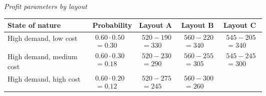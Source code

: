 \begin{ExamProblems}
		\begin{center}
			\textit{Profit parameters by layout}
			\begin{tabular}{l p{0.12\linewidth} p{0.16\linewidth} p{0.16\linewidth} p{0.16\linewidth}}
				\toprule
				State of nature & Probability & Layout A & Layout B & Layout C \\
				\midrule
				High demand, low cost &
				$\begin{array}{l}
					0.60 \cdot 0.50\\
					= 0.30
				\end{array}$ &
				$\begin{array}{l}
					520 - 190\\
					= 330
				\end{array}$ &
				$\begin{array}{l}
					560 - 220\\
					= 340
				\end{array}$ &
				$\begin{array}{l}
					545 - 205\\
					= 340
				\end{array}$ \\
				High demand, medium cost &
				$\begin{array}{l}
					0.60 \cdot 0.30\\
					= 0.18
				\end{array}$ &
				$\begin{array}{l}
					520 - 230\\
					= 290
				\end{array}$ &
				$\begin{array}{l}
					560 - 255\\
					= 305
				\end{array}$ &
				$\begin{array}{l}
					545 - 245\\
					= 300
				\end{array}$ \\
				High demand, high cost &
				$\begin{array}{l}
					0.60 \cdot 0.20\\
					= 0.12
				\end{array}$ &
				$\begin{array}{l}
					520 - 275\\
					= 245
				\end{array}$ &
				$\begin{array}{l}
					560 - 300\\
					= 260
				\end{array}$ &

\end{tabular}
\end{center}
\end{ExamProblems}

